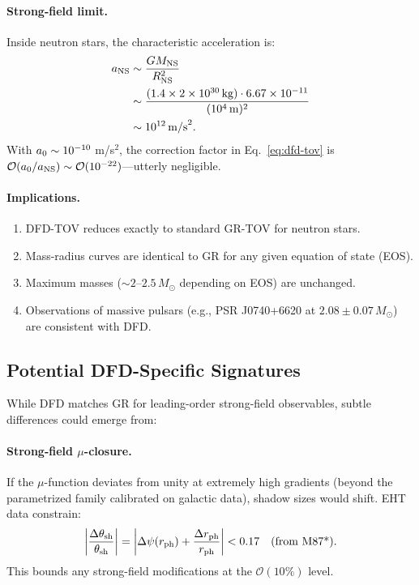 \paragraph{Strong-field limit.}
Inside neutron stars, the characteristic acceleration is:
\begin{equation}
\begin{split}
a_{\rm NS} &\sim \frac{GM_{\rm NS}}{R_{\rm NS}^2} \\
&\sim \frac{(1.4 \times 2 \times 10^{30}\,\text{kg}) \cdot 6.67 \times 10^{-11}}{(10^4\,\text{m})^2} \\
&\sim 10^{12}\,\text{m/s}^2.
\end{split}
\end{equation}
With $a_0 \sim 10^{-10}$ m/s$^2$, the correction factor in Eq.~\eqref{eq:dfd-tov} is $\mathcal{O}(a_0/a_{\rm NS}) \sim \mathcal{O}(10^{-22})$---utterly negligible.

\paragraph{Implications.}
\begin{enumerate}
\item DFD-TOV reduces exactly to standard GR-TOV for neutron stars.
\item Mass-radius curves are identical to GR for any given equation of state (EOS).
\item Maximum masses ($\sim 2$--$2.5\, M_\odot$ depending on EOS) are unchanged.
\item Observations of massive pulsars (e.g., PSR J0740+6620 at $2.08 \pm 0.07\, M_\odot$) are consistent with DFD.
\end{enumerate}

\subsection{Potential DFD-Specific Signatures}\label{sec:strong-signatures}

While DFD matches GR for leading-order strong-field observables, subtle differences could emerge from:

\paragraph{Strong-field $\mu$-closure.}
If the $\mu$-function deviates from unity at extremely high gradients (beyond the parametrized family calibrated on galactic data), shadow sizes would shift. EHT data constrain:
\begin{equation}
\left|\frac{\Delta \theta_{\rm sh}}{\theta_{\rm sh}}\right| = \left|\Delta\psi(r_{\rm ph}) + \frac{\Delta r_{\rm ph}}{r_{\rm ph}}\right| < 0.17 \quad \text{(from M87*)}.
\end{equation}
This bounds any strong-field modifications at the $\mathcal{O}(10\%)$ level.

